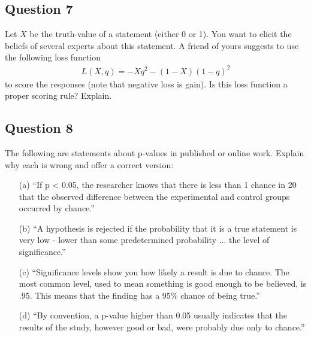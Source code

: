 \documentclass[../main/Notes.tex]{subfiles}
\begin{document}
\subsection*{Question 7}
Let $X$ be the truth-value of a statement (either 0 or 1). You want to elicit the beliefs of several experts about this statement. A friend of yours suggests to use the following loss function 
\begin{align*}
L(X,q) = -Xq^2-(1-X)(1-q)^2
\end{align*}
to score the responses (note that negative loss is gain). Is this loss function a proper scoring rule? Explain.

\subsection*{Question 8}
The following are statements about p-values in published or online work. Explain why each is wrong and offer a correct version:
\begin{itemize}
	\item[(a)] ``If p < 0.05, the researcher knows that there is less than 1 chance in 20 that the observed difference between the experimental and control groups occurred by chance.''
  \item[(b)] ``A hypothesis is rejected if the probability that it is a true statement is very low - lower than some predetermined probability ... the level of significance.''
  \item[(c)] ``Significance levels show you how likely a result is due to chance. The most common level, used to mean something is good enough to be believed, is .95. This means that the finding has a 95\% chance of being true.''
  \item[(d)] ``By convention, a p-value higher than 0.05 usually indicates that the results of the study, however good or bad, were probably due only to chance.''
\end{itemize}
\end{document}
